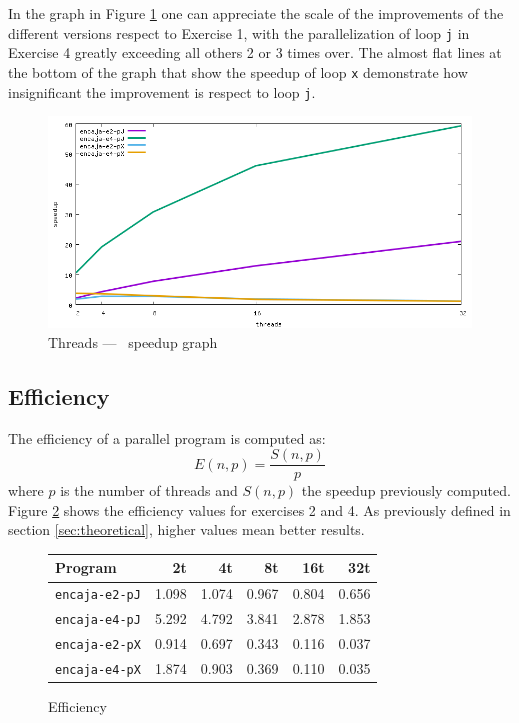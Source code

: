 \documentclass[a4paper]{article}
\begin{document}
In the graph in Figure \ref{fig:graph-speedup} one can appreciate the scale of the improvements of the different versions respect to Exercise 1, with the parallelization of loop \texttt{j} in Exercise 4 greatly exceeding all others 2 or 3 times over. The almost flat lines at the bottom of the graph that show the speedup of loop \texttt{x} demonstrate how insignificant the improvement is respect to loop \texttt{j}.

\begin{figure}[h]
    \centering
    \includegraphics[width=\textwidth]{../img/speedup}
    \caption{Threads --- \unskip \, speedup graph}
    \label{fig:graph-speedup}
\end{figure}

\subsection{Efficiency}
The efficiency of a parallel program is computed as:
\begin{equation}
E(n,p)=\frac{S(n,p)}{p}
\end{equation}
where $p$ is the number of threads and $S(n,p)$ the speedup previously computed. Figure \ref{fig:table-efficiency} shows the efficiency values for exercises 2 and 4. As previously defined in section \ref{sec:theoretical}, higher values mean better results.

\begin{figure}[h]
	\centering
	\begin{tabular}{l r r r r r}
		Program 			  & 2t    & 4t 	  & 8t 	  & 16t   & 32t   \\ \hline
		\texttt{encaja-e2-pJ} & 1.098 & 1.074 & 0.967 & 0.804 & 0.656 \\
		\texttt{encaja-e4-pJ} & 5.292 & 4.792 & 3.841 & 2.878 & 1.853 \\
		\texttt{encaja-e2-pX} & 0.914 & 0.697 & 0.343 & 0.116 & 0.037 \\
		\texttt{encaja-e4-pX} & 1.874 & 0.903 & 0.369 & 0.110 & 0.035 \\ \hline
	\end{tabular}
	\caption{Efficiency}
	\label{fig:table-efficiency}
\end{figure}
\end{document}
